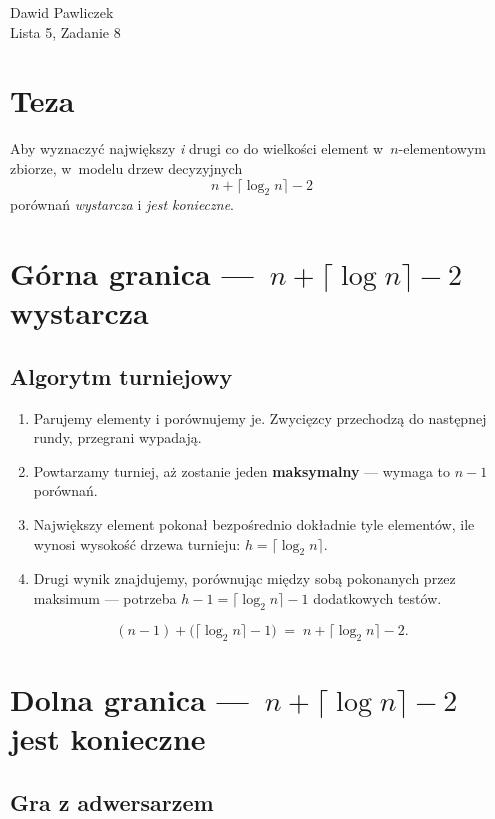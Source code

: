 \documentclass[11pt,a4paper]{article}
\begin{document}
\begin{center}
\Large Dawid Pawliczek\\
Lista 5, Zadanie 8
\end{center}

\bigskip
\section*{Teza}

Aby wyznaczyć największy \emph{i} drugi co do wielkości element
w~$n$-elementowym zbiorze, w~modelu drzew decyzyjnych
\[
  \boxed{\,n+\lceil\log_2 n\rceil-2\,}
\]
porównań \emph{wystarcza} i \emph{jest konieczne}.

\section{Górna granica —~$n+\lceil\log n\rceil-2$ wystarcza}

\subsection*{Algorytm turniejowy}

\begin{enumerate}
\item
Parujemy elementy i porównujemy je.
Zwycięzcy przechodzą do następnej rundy,
przegrani wypadają.
\item
Powtarzamy turniej, aż zostanie jeden \textbf{maksymalny}
— wymaga to $n-1$ porównań.
\item
Największy element pokonał bezpośrednio
dokładnie tyle elementów, ile wynosi
wysokość drzewa turnieju:\;
$h=\lceil\log_2 n\rceil$.
\item
Drugi wynik znajdujemy, porównując między sobą
pokonanych przez maksimum — potrzeba
$h-1=\lceil\log_2 n\rceil-1$ dodatkowych testów.
\end{enumerate}

\[
  (n-1)+\bigl(\lceil\log_2 n\rceil-1\bigr)
  \;=\;
  n+\lceil\log_2 n\rceil-2.
\]

\section{Dolna granica —~$n+\lceil\log n\rceil-2$ jest konieczne}

\subsection*{Gra z adwersarzem}
\end{document}
